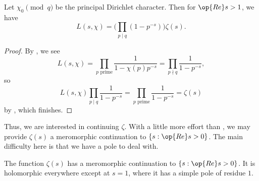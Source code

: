 \documentclass[../notes.tex]{subfiles}
\begin{document}
\begin{lemma} \label{lem:l-s-principal}
	Let $\chi_0\pmod q$ be the principal Dirichlet character. Then for $\op{Re}s>1$, we have
	\[L(s,\chi)=\Bigg(\prod_{p\mid q}\left(1-p^{-s}\right)\bigg)\zeta(s).\]
\end{lemma}
\begin{proof}
	By , we see
	\[L(s,\chi)=\prod_{p\text{ prime}}\frac1{1-\chi(p)p^{-s}}=\prod_{p\nmid q}\frac1{1-p^{-s}},\]
	so
	\[L(s,\chi)\prod_{p\mid q}\frac1{1-p^{-s}}=\prod_{p\text{ prime}}\frac1{1-p^{-s}}=\zeta(s)\]
	by , which finishes.
\end{proof}
Thus, we are interested in continuing $\zeta$. With a little more effort than , we may provide $\zeta(s)$ a meromorphic continuation to $\{s:\op{Re}s>0\}$. The main difficulty here is that we have a pole to deal with.
\begin{proposition} \label{prop:continue-zeta}
	The function $\zeta(s)$ has a meromorphic continuation to $\{s:\op{Re}s>0\}$. It is holomorphic everywhere except at $s=1$, where it has a simple pole of residue $1$.
\end{proposition}
\end{document}

